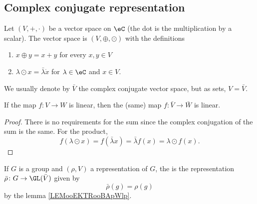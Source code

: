 \subsection{Complex conjugate representation}

\begin{definition}
	Let \( (V,+,\cdot)\) be a vector space on \( \eC\) (the dot is the multiplication by a scalar). The  vector space is \( (V,\oplus,\odot)\) with the definitions
	\begin{enumerate}
		\item
		      \( x\oplus y=x+y\) for every \( x,y\in V\)
		\item
		      \( \lambda\odot x=\bar \lambda\dot x\) for \( \lambda\in \eC\) and \( x\in V\).
	\end{enumerate}
	We usually denote by \( \bar V\) the complex conjugate vector space, but as sets, \( V=\bar V\).
\end{definition}

\begin{lemma}       \label{LEMooEKTRooBApWlp}
	If the map \( f\colon V\to W\) is linear, then the (same) map \( f\colon \bar V\to \bar W\) is linear.
\end{lemma}

\begin{proof}
	There is no requirements for the sum since the complex conjugation of the sum is the same. For the product,
	\begin{equation}
		f(\lambda\odot x)=f(\bar \lambda x)=\bar \lambda f(x)=\lambda\odot f(x).
	\end{equation}
\end{proof}

\begin{definition}
	If \( G\) is a group and \( (\rho, V)\) a representation of \( G\), the  is the representation \( \bar \rho\colon G\to \GL(\bar V)\) given by
	\begin{equation}
		\bar\rho(g)=\rho(g)
	\end{equation}
	by the lemma \ref{LEMooEKTRooBApWlp}.
\end{definition}


